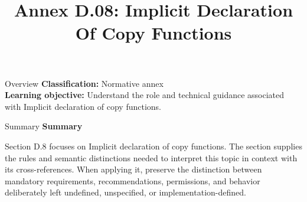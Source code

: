 \documentclass[10pt,letterpaper]{article}
\title{Annex D.08: Implicit Declaration Of Copy Functions}
\author{}
\date{}
\begin{document}
\maketitle
\begin{CornellOverviewBox}{Overview}
\textbf{Classification:} Normative annex\\[2pt]
\textbf{Learning objective:} Understand the role and technical guidance associated with Implicit declaration of copy functions.
\end{CornellOverviewBox}\begin{CornellSummaryBox}{Summary}
{\sffamily\bfseries\color{Accent} Summary}\par\vspace{3pt}Section D.8 focuses on Implicit declaration of copy functions. The section supplies the rules and semantic distinctions needed to interpret this topic in context with its cross-references. When applying it, preserve the distinction between mandatory requirements, recommendations, permissions, and behavior deliberately left undefined, unspecified, or implementation-defined.
\end{CornellSummaryBox}
\end{document}
